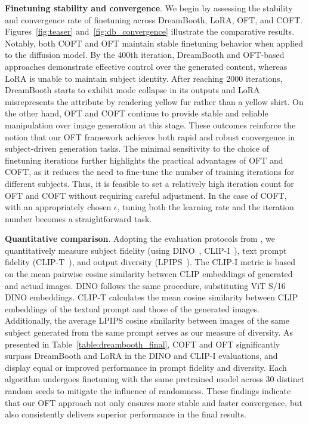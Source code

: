 \textbf{Finetuning stability and convergence}. We begin by assessing the stability and convergence rate of finetuning across DreamBooth, LoRA, OFT, and COFT. Figures~\ref{fig:teaser} and~\ref{fig:db_convergence} illustrate the comparative results. Notably, both COFT and OFT maintain stable finetuning behavior when applied to the diffusion model. By the 400th iteration, DreamBooth and OFT-based approaches demonstrate effective control over the generated content, whereas LoRA is unable to maintain subject identity. After reaching 2000 iterations, DreamBooth starts to exhibit mode collapse in its outputs and LoRA misrepresents the attribute by rendering yellow fur rather than a yellow shirt. On the other hand, OFT and COFT continue to provide stable and reliable manipulation over image generation at this stage. These outcomes reinforce the notion that our OFT framework achieves both rapid and robust convergence in subject-driven generation tasks. The minimal sensitivity to the choice of finetuning iterations further highlights the practical advantages of OFT and COFT, as it reduces the need to fine-tune the number of training iterations for different subjects. Thus, it is feasible to set a relatively high iteration count for OFT and COFT without requiring careful adjustment. In the case of COFT, with an appropriately chosen $\epsilon$, tuning both the learning rate and the iteration number becomes a straightforward task.

\textbf{Quantitative comparison}. Adopting the evaluation protocols from \cite{ruiz2023dreambooth}, we quantitatively measure subject fidelity (using DINO~\cite{caron2021emerging}, CLIP-I~\cite{radford2021learning}), text prompt fidelity (CLIP-T~\cite{radford2021learning}), and output diversity (LPIPS~\cite{zhang2018unreasonable}). The CLIP-I metric is based on the mean pairwise cosine similarity between CLIP embeddings of generated and actual images. DINO follows the same procedure, substituting ViT S/16 DINO embeddings. CLIP-T calculates the mean cosine similarity between CLIP embeddings of the textual prompt and those of the generated images. Additionally, the average LPIPS cosine similarity between images of the same subject generated from the same prompt serves as our measure of diversity. As presented in Table~\ref{table:dreambooth_final}, COFT and OFT significantly surpass DreamBooth and LoRA in the DINO and CLIP-I evaluations, and display equal or improved performance in prompt fidelity and diversity. Each algorithm undergoes finetuning with the same pretrained model across 30 distinct random seeds to mitigate the influence of randomness. These findings indicate that our OFT approach not only ensures more stable and faster convergence, but also consistently delivers superior performance in the final results.

